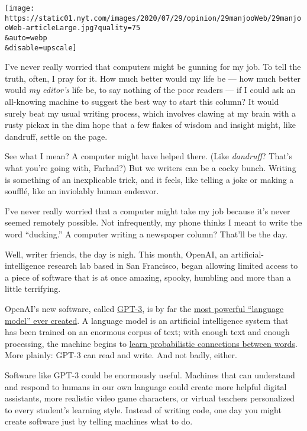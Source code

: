 \texttt{[image: https://static01.nyt.com/images/2020/07/29/opinion/29manjooWeb/29manjooWeb-articleLarge.jpg?quality=75\\\&auto=webp\\\&disable=upscale]}

I've never really worried that computers might be gunning for my job. To
tell the truth, often, I pray for it. How much better would my life be
--- how much better would \emph{my editor's} life be, to say nothing of
the poor readers --- if I could ask an all-knowing machine to suggest
the best way to start this column? It would surely beat my usual writing
process, which involves clawing at my brain with a rusty pickax in the
dim hope that a few flakes of wisdom and insight might, like dandruff,
settle on the page.

See what I mean? A computer might have helped there. (Like
\emph{dandruff}? That's what you're going with, Farhad?) But we writers
can be a cocky bunch. Writing is something of an inexplicable trick, and
it feels, like telling a joke or making a soufflé, like an inviolably
human endeavor.

I've never really worried that a computer might take my job because it's
never seemed remotely possible. Not infrequently, my phone thinks I
meant to write the word ``ducking.'' A computer writing a newspaper
column? That'll be the day.

Well, writer friends, the day is nigh. This month, OpenAI, an
artificial-intelligence research lab based in San Francisco, began
allowing limited access to a piece of software that is at once amazing,
spooky, humbling and more than a little terrifying.

OpenAI's new software, called
\href{https://openai.com/blog/openai-api/}{GPT-3}, is by far the
\href{https://towardsdatascience.com/gpt-3-the-new-mighty-language-model-from-openai-a74ff35346fc}{most
powerful ``language model'' ever created}. A language model is an
artificial intelligence system that has been trained on an enormous
corpus of text; with enough text and enough processing, the machine
begins to
\href{https://www.analyticsvidhya.com/blog/2019/08/comprehensive-guide-language-model-nlp-python-code/}{learn
probabilistic connections between words}. More plainly: GPT-3 can read
and write. And not badly, either.

Software like GPT-3 could be enormously useful. Machines that can
understand and respond to humans in our own language could create more
helpful digital assistants, more realistic video game characters, or
virtual teachers personalized to every student's learning style. Instead
of writing code, one day you might create software just by telling
machines what to do.

